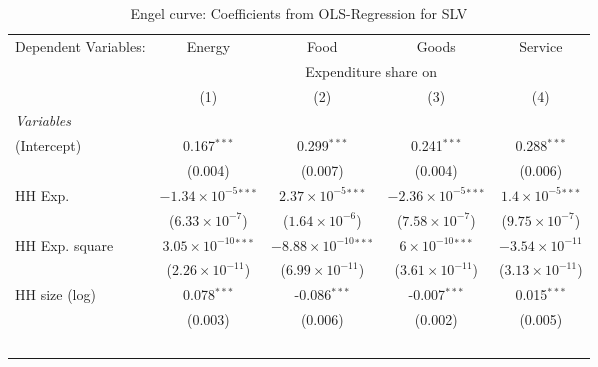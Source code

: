 
\begin{table}[htbp!]
   \centering
   \small
   \begin{adjustbox}{width = 1\textwidth, max height = 0.95\textheight, center}
      \begin{threeparttable}[b]
         \caption{\label{tab:Engel_parametric_SLV} Engel curve: Coefficients from OLS-Regression for SLV}
         \begin{tabular}{lcccc}
            \tabularnewline \midrule \midrule
            Dependent Variables: & Energy                         & Food                            & Goods                          & Service\\  
             & \multicolumn{4}{c}{Expenditure share on} \\ 
                                 & (1)                            & (2)                             & (3)                            & (4)\\  
            \midrule
            \emph{Variables}\\
            (Intercept)          & 0.167$^{***}$                  & 0.299$^{***}$                   & 0.241$^{***}$                  & 0.288$^{***}$\\   
                                 & (0.004)                        & (0.007)                         & (0.004)                        & (0.006)\\   
            HH Exp.              & $-1.34\times 10^{-5}$$^{***}$  & $2.37\times 10^{-5}$$^{***}$    & $-2.36\times 10^{-5}$$^{***}$  & $1.4\times 10^{-5}$$^{***}$\\    
                                 & ($6.33\times 10^{-7}$)         & ($1.64\times 10^{-6}$)          & ($7.58\times 10^{-7}$)         & ($9.75\times 10^{-7}$)\\    
            HH Exp. square       & $3.05\times 10^{-10}$$^{***}$  & $-8.88\times 10^{-10}$$^{***}$  & $6\times 10^{-10}$$^{***}$     & $-3.54\times 10^{-11}$\\    
                                 & ($2.26\times 10^{-11}$)        & ($6.99\times 10^{-11}$)         & ($3.61\times 10^{-11}$)        & ($3.13\times 10^{-11}$)\\    
            HH size (log)        & 0.078$^{***}$                  & -0.086$^{***}$                  & -0.007$^{***}$                 & 0.015$^{***}$\\   
                                 & (0.003)                        & (0.006)                         & (0.002)                        & (0.005)\\   
$$
\end{tabular}
\end{threeparttable}
\end{adjustbox}
\end{table}
